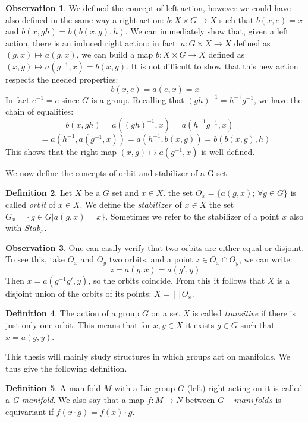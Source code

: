 \documentclass[12pt,a4paper]{report}
\theoremstyle{definition}
\newtheorem{Def}{Definition}[chapter]
\theoremstyle{Theorem}
\theoremstyle{definition}
\theoremstyle{definition}
\newtheorem{Obs}[Def]{Observation}
\begin{document}
	\begin{Obs}
		We defined the concept of left action, however we could have also defined in the same way a right action: $b:X\times G\rightarrow X$ such that $b(x,e)=x$ and $b(x,gh)=b(b(x,g),h)$. We can immediately show that, given a left action, there is an induced right action: in fact: $a:G\times X\rightarrow X$ defined as $(g,x)\longmapsto a(g,x)$, we can build a map $b:X\times G\rightarrow X$ defined as $(x,g)\longmapsto a(g^{-1},x)=b(x,g)$. 
		It is not difficult to show that this new action respects the needed properties:
		$$b(x,e)=a(e,x)=x$$
		In fact $e^{-1}=e$ since $G$ is a group. Recalling that $(gh)^{-1}=h^{-1}g^{-1}$, we have the chain of equalities:
		$$b(x,gh)=a((gh)^{-1},x)=a(h^{-1}g^{-1},x)=$$$$=a(h^{-1},a(g^{-1},x))=a(h^{-1},b(x,g))=b(b(x,g),h)$$
		This shows that the right map $(x,g)\longmapsto a(g^{-1},x)$ is well defined.
	\end{Obs}
	We now define the concepts of orbit and stabilizer of a G set.
	\begin{Def}
		Let $X$ be a $G$ set and $x\in X$. the set $O_x=\{a(g,x); \, \forall g\in G\}$ is called \textit{orbit} of $x\in X$. We define the $\textit{stabilizer}$ of $x\in X$ the set $G_x=\{g\in G|a(g,x)=x\}$. Sometimes we refer to the stabilizer of a point $x$ also with $Stab_x$.
	\end{Def}
	\begin{Obs} \label{Obs: 2.1}
		One can easily verify that two orbits are either equal or disjoint. To see this, take $O_x$ and $O_y$ two orbits, and a point $z\in O_x\cap O_y$, we can write:
		$$z=a(g,x)=a(g',y)$$
		Then $x=a(g^{-1}g',y)$, so the orbits coincide.
		From this it follows that $X$ is a disjoint union of the orbits of its points: $X=\bigsqcup O_x$.
	\end{Obs}
	\begin{Def}
		The action of a group $G$ on a set $X$ is called \textit{transitive} if there is just only one orbit. This means that for $x,y\in X$ it exists $g\in G$ such that $x=a(g,y)$.
	\end{Def}
	This thesis will mainly study structures in which groups act on manifolds. We thus give the following definition.
	\begin{Def}
		A manifold $M$ with a Lie group $G$ (left) right-acting on it is called a \textit{G-manifold}. We also say that a map $f:M\rightarrow N$ between $G-manifolds$ is equivariant if $f(x\cdot g)=f(x)\cdot g$.
	\end{Def}		
\end{document}
